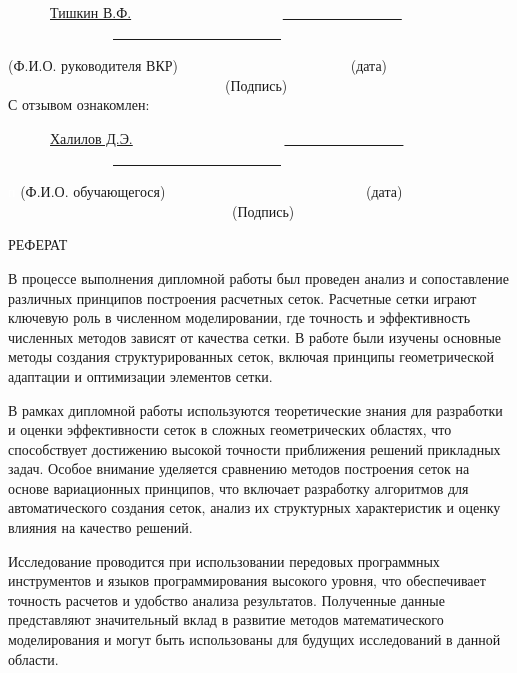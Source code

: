 \documentclass[a4paper,14pt,russian]{extreport}
\renewcommand{\_}{\kern-1.5pt\textunderscore\kern-1.5pt}
\begin{document}
	\uline{}
	
	\begin{small}
		
		\thispagestyle{empty}
		\ \ \ \ \ \ \uline{Тишкин В.Ф.} \ \ \ \ \ \ \ \ \ \ \ \ \ \ \ \ \ \ \ \ \ \uline{\ \ \ \ \ \ \ \ \ \ \ \ \ \ \ \ \ } \ \ \ \ \ \ \ \ \ \ \ \ \ \ \ \uline{\ \ \ \ \ \ \ \ \ \ \ \ \ \ \ \ \ \ \ \ \ \ \ \ }\par
		{\fontsize{10pt}{12.0pt}\selectfont  (Ф.И.О. руководителя ВКР) \ \ \ \ \ \ \ \ \ \ \ \ \ \ \ \ \ \ \ \ \ \ \ \ (дата) \ \ \ \ \ \ \ \ \ \ \ \ \ \ \ \ \ \ \ \ \ \ \ \ \ \ \ \  \ \ \ (Подпись) }\\
		С отзывом ознакомлен:\par
		\ \ \ \ \ \ \uline{Халилов Д.Э.} \ \ \ \ \ \ \ \ \ \ \ \ \ \ \ \ \ \ \ \ \ \uline{\ \ \ \ \ \ \ \ \ \ \ \ \ \ \ \ \ } \ \ \ \ \ \ \ \ \ \ \ \ \ \ \ \uline{\ \ \ \ \ \ \ \ \ \ \ \ \ \ \ \ \ \ \ \ \ \ \ \ }\par
		{\fontsize{10pt}{12.0pt}\selectfont \textcolor{white}{п}  (Ф.И.О. обучающегося) \ \ \ \ \ \ \ \ \ \ \ \ \ \ \ \ \ \ \ \ \ \ \ \ \ \ \ \ (дата) \ \ \ \ \ \ \ \ \ \ \ \ \ \ \ \ \ \ \ \ \ \ \ \ \ \ \ \ \ \ \ \ (Подпись) }\\
	\end{small}
	\newpage
	\begin{center}
		РЕФЕРАТ
  	\end{center} 
   
В процессе выполнения дипломной работы был проведен анализ и сопоставление различных принципов построения расчетных сеток. Расчетные сетки играют ключевую роль в численном моделировании, где точность и эффективность численных методов зависят от качества сетки. В работе были изучены основные методы создания структурированных сеток, включая принципы геометрической адаптации и оптимизации элементов сетки.

В рамках дипломной работы используются теоретические знания для разработки и оценки эффективности сеток в сложных геометрических областях, что способствует достижению высокой точности приближения решений прикладных задач. Особое внимание уделяется сравнению методов построения сеток на основе вариационных принципов, что включает разработку алгоритмов для автоматического создания сеток, анализ их структурных характеристик и оценку влияния на качество решений.

Исследование проводится при использовании передовых программных инструментов и языков программирования высокого уровня, что обеспечивает точность расчетов и удобство анализа результатов. Полученные данные представляют значительный вклад в развитие методов математического моделирования и могут быть использованы для будущих исследований в данной области.
\end{document}
